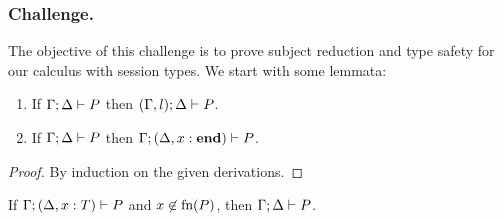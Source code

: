 \subsubsection{Challenge.}
The objective of this challenge is to prove subject reduction and type safety for our calculus with session types. We start with some lemmata:

\begin{lemma}[Weakening]\mbox{}
  \label{lemma:weak}
  \begin{enumerate}
  \item If \( \Gamma; \Delta \vdash P \) then
    \( (\Gamma, l);\Delta \vdash P \).
  \item If \( \Gamma; \Delta \vdash P \) %
    then
    \( \Gamma;(\Delta, x : \mathbf{end}) \vdash P \).
  \end{enumerate}
\end{lemma}
\begin{proof}
  By induction on the given derivations.
\end{proof}
\begin{lemma}[Strengthening]\mbox{}
  \label{lemma:strenD}
  If \( \Gamma; (\Delta, x : T) \vdash P \) and
  $x\not\in \textrm{fn}(P)$, then \( \Gamma; \Delta \vdash P \).
\end{lemma}
